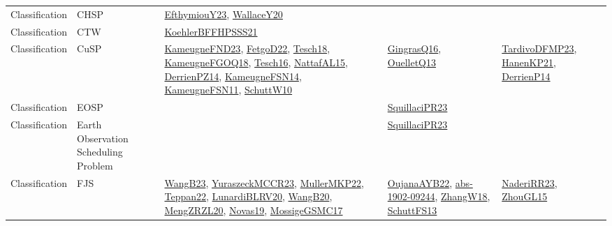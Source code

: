 {\begin{longtable}{lp{3cm}>{\raggedright}p{6cm}>{\raggedright}p{6cm}p{8cm}}
Classification & CHSP & \href{papers/EfthymiouY23.pdf}{EfthymiouY23}\cite{EfthymiouY23}, \href{articles/WallaceY20.pdf}{WallaceY20}\cite{WallaceY20} &  & \\
Classification & CTW & \href{articles/KoehlerBFFHPSSS21.pdf}{KoehlerBFFHPSSS21}\cite{KoehlerBFFHPSSS21} &  & \\
Classification & CuSP & \href{papers/KameugneFND23.pdf}{KameugneFND23}\cite{KameugneFND23}, \href{articles/FetgoD22.pdf}{FetgoD22}\cite{FetgoD22}, \href{papers/Tesch18.pdf}{Tesch18}\cite{Tesch18}, \href{papers/KameugneFGOQ18.pdf}{KameugneFGOQ18}\cite{KameugneFGOQ18}, \href{papers/Tesch16.pdf}{Tesch16}\cite{Tesch16}, \href{articles/NattafAL15.pdf}{NattafAL15}\cite{NattafAL15}, \href{papers/DerrienPZ14.pdf}{DerrienPZ14}\cite{DerrienPZ14}, \href{articles/KameugneFSN14.pdf}{KameugneFSN14}\cite{KameugneFSN14}, \href{papers/KameugneFSN11.pdf}{KameugneFSN11}\cite{KameugneFSN11}, \href{papers/SchuttW10.pdf}{SchuttW10}\cite{SchuttW10} & \href{papers/GingrasQ16.pdf}{GingrasQ16}\cite{GingrasQ16}, \href{papers/OuelletQ13.pdf}{OuelletQ13}\cite{OuelletQ13} & \href{papers/TardivoDFMP23.pdf}{TardivoDFMP23}\cite{TardivoDFMP23}, \href{papers/HanenKP21.pdf}{HanenKP21}\cite{HanenKP21}, \href{papers/DerrienP14.pdf}{DerrienP14}\cite{DerrienP14}\\
Classification & EOSP &  & \href{papers/SquillaciPR23.pdf}{SquillaciPR23}\cite{SquillaciPR23} & \\
Classification & Earth Observation Scheduling Problem &  & \href{papers/SquillaciPR23.pdf}{SquillaciPR23}\cite{SquillaciPR23} & \\
Classification & FJS & \href{papers/WangB23.pdf}{WangB23}\cite{WangB23}, \href{articles/YuraszeckMCCR23.pdf}{YuraszeckMCCR23}\cite{YuraszeckMCCR23}, \href{articles/MullerMKP22.pdf}{MullerMKP22}\cite{MullerMKP22}, \href{papers/Teppan22.pdf}{Teppan22}\cite{Teppan22}, \href{articles/LunardiBLRV20.pdf}{LunardiBLRV20}\cite{LunardiBLRV20}, \href{papers/WangB20.pdf}{WangB20}\cite{WangB20}, \href{articles/MengZRZL20.pdf}{MengZRZL20}\cite{MengZRZL20}, \href{articles/Novas19.pdf}{Novas19}\cite{Novas19}, \href{papers/MossigeGSMC17.pdf}{MossigeGSMC17}\cite{MossigeGSMC17} & \href{papers/OujanaAYB22.pdf}{OujanaAYB22}\cite{OujanaAYB22}, \href{articles/abs-1902-09244.pdf}{abs-1902-09244}\cite{abs-1902-09244}, \href{articles/ZhangW18.pdf}{ZhangW18}\cite{ZhangW18}, \href{papers/SchuttFS13.pdf}{SchuttFS13}\cite{SchuttFS13} & \href{articles/NaderiRR23.pdf}{NaderiRR23}\cite{NaderiRR23}, \href{papers/ZhouGL15.pdf}{ZhouGL15}\cite{ZhouGL15}\\

\end{longtable}}
